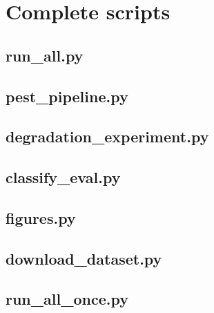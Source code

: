 \documentclass[12pt,a4paper]{article}
\let\oldsection\section
\renewcommand{\section}{\clearpage\oldsection}
\begin{document}
\section{Complete scripts}
\begin{singlespace}
\subsection{run\_all.py}

\subsection{pest\_pipeline.py}

\subsection{degradation\_experiment.py}

\subsection{classify\_eval.py}

\subsection{figures.py}

\subsection{download\_dataset.py}

\subsection{run\_all\_once.py}

\end{singlespace}
\end{document}
